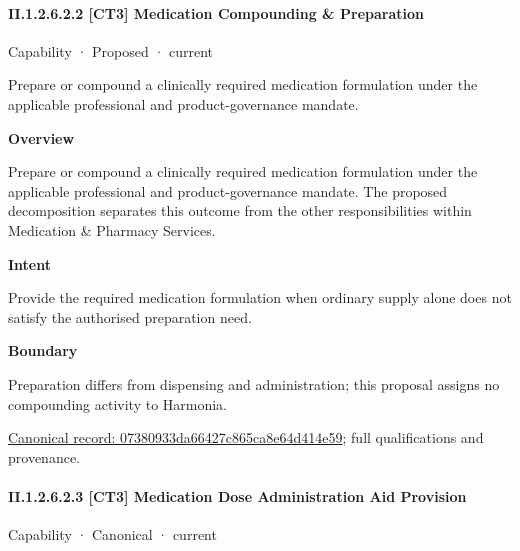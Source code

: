 \paragraph*{II.1.2.6.2.2 [CT3] Medication Compounding \& Preparation}
\label{navigation:II.1.2.6.2.2}

\label{element:07380933da66427c865ca8e64d414e59}
{\small Capability · Proposed · current}\par

Prepare or compound a clinically required medication formulation under the applicable professional and product-governance mandate.



\textbf{Overview}



Prepare or compound a clinically required medication formulation under the applicable professional and product-governance mandate. The proposed decomposition separates this outcome from the other responsibilities within Medication \& Pharmacy Services.



\textbf{Intent}



Provide the required medication formulation when ordinary supply alone does not satisfy the authorised preparation need.



\textbf{Boundary}



Preparation differs from dispensing and administration; this proposal assigns no compounding activity to Harmonia.


{\footnotesize \href{../../../../continuum/strategy/capability/07380933da66427c865ca8e64d414e59.md}{Canonical record: 07380933da66427c865ca8e64d414e59}; full qualifications and provenance.}\par
\paragraph*{II.1.2.6.2.3 [CT3] Medication Dose Administration Aid Provision}
\label{navigation:II.1.2.6.2.3}

\label{element:bd597608766b4d709703977c02cc5f07}
{\small Capability · Canonical · current}\par

